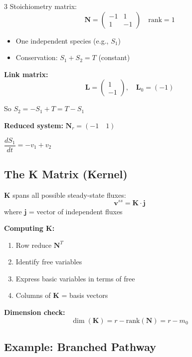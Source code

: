 \documentclass[10pt,landscape,letter]{article}
\begin{document}
\begin{multicols}{3}
Stoichiometry matrix:
\begin{equation*}
\mathbf{N} = \begin{pmatrix} -1 & 1 \\ 1 & -1 \end{pmatrix} \quad \text{rank} = 1
\end{equation*}

\begin{itemize}
\item One independent species (e.g., $S_1$)
\item Conservation: $S_1 + S_2 = T$ (constant)
\end{itemize}

\textbf{Link matrix:}
\begin{equation*}
\mathbf{L} = \begin{pmatrix} 1 \\ -1 \end{pmatrix}, \quad \mathbf{L}_0 = (-1)
\end{equation*}

So $S_2 = -S_1 + T = T - S_1$

\textbf{Reduced system:}
$\mathbf{N}_r = (-1 \quad 1)$

$\dfrac{dS_1}{dt} = -v_1 + v_2$

\subsection{The K Matrix (Kernel)}

$\mathbf{K}$ spans all possible steady-state fluxes:
\begin{equation*}
\mathbf{v}^{ss} = \mathbf{K} \cdot \mathbf{j}
\end{equation*}
where $\mathbf{j}$ = vector of independent fluxes

\textbf{Computing K:}
\begin{enumerate}
\item Row reduce $\mathbf{N}^T$
\item Identify free variables
\item Express basic variables in terms of free
\item Columns of $\mathbf{K}$ = basis vectors
\end{enumerate}

\textbf{Dimension check:}
\begin{equation*}
\dim(\mathbf{K}) = r - \text{rank}(\mathbf{N}) = r - m_0
\end{equation*}

\subsection{Example: Branched Pathway}


\end{multicols}
\end{document}
